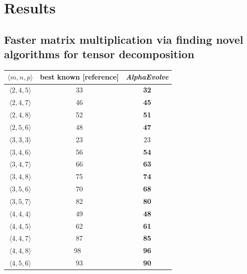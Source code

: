 \documentclass[logo,copyright,12pt]{googledeepmind}
\theoremstyle{definition}
\theoremstyle{remark}
\theoremstyle{plain}
\newcommand{\method}{\emph{AlphaEvolve}\xspace}
\begin{document}
\section{Results}
\label{sec:results}

\subsection{Faster matrix multiplication via finding novel algorithms for tensor decomposition}
\label{subsec:matmul}

\begin{table}[t]
\begin{center}
    \begin{tabular}{ccc}
    $\langle m, n, p \rangle$ & best known [reference] & \method \\ \midrule
    $\langle 2, 4, 5 \rangle$ & 33 \citep{hopcroft} & \textbf{32} \\
    $\langle 2, 4, 7 \rangle$ & 46 \citep{smirnov2013bilinear} & \textbf{45} \\
    $\langle 2, 4, 8 \rangle$ & 52 \citep{smirnov2013bilinear} & \textbf{51} \\
    $\langle 2, 5, 6 \rangle$ & 48 \citep{smirnov2013bilinear}   & \textbf{47}    \\ 
    $\langle 3, 3, 3 \rangle$ & 23 \citep{laderman}   & 23   \\
    $\langle 3, 4, 6 \rangle$ & 56 \citep{Kauers_2025}   & \textbf{54}   \\ 
    $\langle 3, 4, 7 \rangle$ & 66 \citep{smirnov2021}   & \textbf{63}   \\ 
    $\langle 3, 4, 8 \rangle$ & 75 \citep{smirnov2021}   & \textbf{74}    \\ 
    $\langle 3, 5, 6 \rangle$ & 70 \citep{Kauers_2025}   & \textbf{68}    \\
    $\langle 3, 5, 7 \rangle$ & 82 \citep{smirnov2021}   & \textbf{80}    \\ 
    $\langle 4, 4, 4 \rangle$ & 49 \citep{strassen1969gaussian}   & \textbf{48}  \\ 
    $\langle 4, 4, 5 \rangle$ & 62 \citep{kauers2023flip}   & \textbf{61}    \\
    $\langle 4, 4, 7 \rangle$ & 87 \citep{smirnov2013bilinear} & \textbf{85}    \\
    $\langle 4, 4, 8 \rangle$ & 98~\citep{strassen1969gaussian} & {\textbf{96}} \\ 
    $\langle 4, 5, 6 \rangle$ & 93 \citep{Kauers_2025}   & \textbf{90}    \\ 

\end{tabular}
\end{center}
\end{table}
\end{document}
